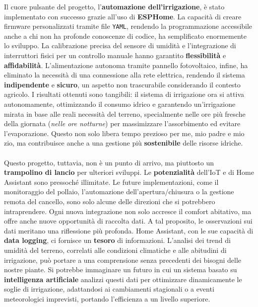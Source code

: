 \documentclass[11pt, a4paper]{article}
\begin{document}
Il cuore pulsante del progetto, l'\textbf{automazione dell'irrigazione}, è stato implementato 
con successo grazie all'uso di \textbf{ESPHome}. La capacità di creare firmware 
personalizzati tramite file \texttt{YAML}, rendendo la programmazione accessibile anche a 
chi non ha profonde conoscenze di codice, ha semplificato enormemente lo sviluppo. 
La calibrazione precisa del sensore di umidità e l'integrazione di interruttori 
fisici per un controllo manuale hanno garantito \textbf{flessibilità} e \textbf{affidabilità}. L'alimentazione autonoma tramite 
pannello fotovoltaico, infine, ha eliminato la necessità di una connessione alla rete elettrica, rendendo il 
sistema \textbf{indipendente} e \textbf{sicuro}, un aspetto non trascurabile considerando il contesto agricolo.
I risultati ottenuti sono tangibili: il sistema di irrigazione ora si attiva autonomamente, ottimizzando il 
consumo idrico e garantendo un'irrigazione mirata in base alle reali necessità del terreno, specialmente 
nelle ore più fresche della giornata (\textit{nelle ore notturne}) per massimizzare l'assorbimento ed evitare l'evaporazione. Questo non 
solo libera tempo prezioso per me, mio padre e mio zio, ma contribuisce anche a una gestione più \textbf{sostenibile} 
delle risorse idriche.\\
\\
Questo progetto, tuttavia, non è un punto di arrivo, ma piuttosto un \textbf{trampolino di lancio} per ulteriori sviluppi.
Le \textbf{potenzialità} dell'IoT e di Home Assistant sono pressoché illimitate. Le future implementazioni, come il 
monitoraggio del pollaio, l'automazione dell'apertura/chiusura o la gestione remota del cancello, sono solo 
alcune delle direzioni che si potrebbero intraprendere. Ogni nuova integrazione non solo accresce il comfort 
abitativo, ma offre anche nuove opportunità di raccolta dati.
A tal proposito, le osservazioni sui dati meritano una riflessione più profonda. Home Assistant, con le sue 
capacità di \textbf{data logging}, ci fornisce un \textbf{tesoro} di informazioni. L'analisi dei trend di umidità del terreno, 
correlati alle condizioni climatiche e alle abitudini di irrigazione, può portare a una comprensione senza 
precedenti dei bisogni delle nostre piante. Si potrebbe immaginare un futuro in cui un sistema basato su 
\textbf{intelligenza artificiale} analizzi questi dati per ottimizzare dinamicamente le soglie di irrigazione, 
adattandosi ai cambiamenti stagionali o a eventi meteorologici imprevisti, portando l'efficienza a un 
livello superiore.\\
\end{document}
